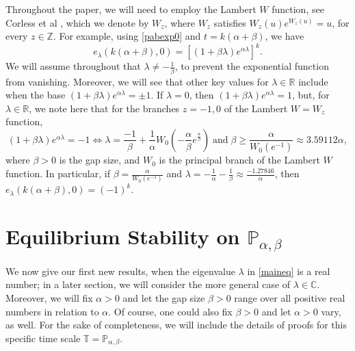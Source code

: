 \documentclass[12pt,reqno]{amsart}
\theoremstyle{plain}
\theoremstyle{definition}
\newcommand{\R}{\ensuremath{\mathbb{R}}}
\newcommand{\Z}{\ensuremath{\mathbb{Z}}}
\newcommand{\T}{\ensuremath{\mathbb{T}}}
\newcommand{\C}{\ensuremath{\mathbb{C}}}
\newcommand{\p}{\ensuremath{\mathbb{P}}}
\numberwithin{equation}{section}
\numberwithin{theorem}{section}
\begin{document}
Throughout the paper, we will need to employ the Lambert $W$ function, see Corless et al \cite{Wfunction}, which we denote by $W_z$, where $W_z$ satisfies $W_z(u)e^{W_z(u)}=u$, for every $z\in\Z$. For example, using \eqref{pabexp0} and $t=k(\alpha+\beta)$, we have
\[ e_{\lambda}(k(\alpha+\beta),0) = [(1+\beta\lambda)e^{\alpha\lambda}]^k. \]
We will assume throughout that $\lambda\ne -\frac{1}{\beta}$, to prevent the exponential function from vanishing. Moreover, we will see that other key values for $\lambda\in\R$ include when the base $(1+\beta\lambda)e^{\alpha\lambda}=\pm 1$. If $\lambda=0$, then $(1+\beta\lambda)e^{\alpha\lambda}=1$, but, for $\lambda\in\R$, we note here that for the branches $z=-1,0$ of the Lambert $W=W_z$ function,
\[ (1+\beta\lambda)e^{\alpha\lambda}=-1 \Longleftrightarrow \lambda = \frac{-1}{\beta}+\frac{1}{\alpha}W_0\left(-\frac{\alpha}{\beta}e^{\frac{\alpha}{\beta}}\right) \;\text{and}\; \beta\ge\frac{\alpha}{W_0(e^{-1})}\approx 3.59112\alpha, \] 
where $\beta>0$ is the gap size, and $W_0$ is the principal branch of the Lambert $W$ function. In particular, if $\beta=\frac{\alpha}{W_0(e^{-1})}$ and $\lambda=-\frac{1}{\alpha}-\frac{1}{\beta}\approx \frac{-1.27846}{\alpha}$, then $e_{\lambda}(k(\alpha+\beta),0)=(-1)^k$.


\section{Equilibrium Stability on $\p_{\alpha,\beta}$}

We now give our first new results, when the eigenvalue $\lambda$ in \eqref{maineq} is a real number; in a later section, we will consider the more general case of $\lambda\in\C$. Moreover, we will fix $\alpha>0$ and let the gap size $\beta>0$ range over all positive real numbers in relation to $\alpha$. Of course, one could also fix $\beta>0$ and let $\alpha>0$ vary, as well. For the sake of completeness, we will include the details of proofs for this specific time scale 
$\T=\p_{\alpha,\beta}$. 

\end{document}
